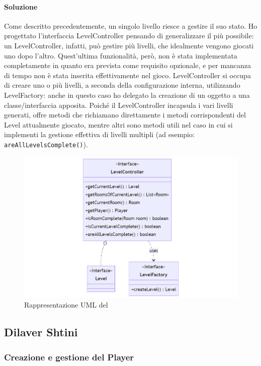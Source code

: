 \documentclass[a4paper,12pt]{report}
\begin{document}
\paragraph{Soluzione} Come descritto precedentemente, un singolo livello riesce a gestire il suo stato. 
Ho progettato l'interfaccia LevelController pensando di generalizzare il più possibile: un LevelController, 
infatti, può gestire più livelli, che idealmente vengono giocati uno dopo l'altro.
Quest'ultima funzionalità, però, non è stata implementata completamente in quanto era
prevista come requisito opzionale, e per mancanza di tempo non è stata inserita effettivamente nel gioco.
LevelController si occupa di creare uno o più livelli, a seconda della configurazione interna, utilizzando LevelFactory: 
anche in questo caso ho delegato la creazione di un oggetto a una classe/interfaccia apposita.
Poiché il LevelController incapsula i vari livelli generati, offre metodi che richiamano direttamente i metodi corrispondenti
del Level attualmente giocato, mentre altri sono metodi utili nel caso in cui si implementi la gestione effettiva di livelli
multipli (ad esempio: \texttt{areAllLevelsComplete()}).
\begin{figure}[H]
    \centering{}
    \includegraphics[scale=0.5]{diagram/levelController.png}
    \caption{Rappresentazione UML del }
    \label{img:levelController}
\end{figure}


\subsection*{Dilaver Shtini}
\subsubsection{Creazione e gestione del Player}
\end{document}
